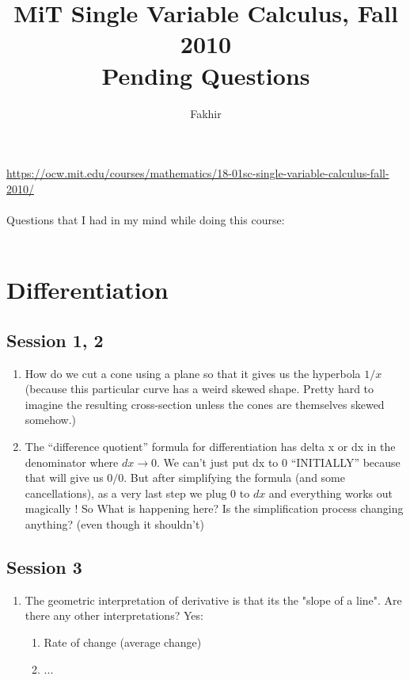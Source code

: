 \documentclass[]{article}
\title{MiT Single Variable Calculus, Fall 2010 \\ Pending Questions}
\author{Fakhir}
\begin{document}
\maketitle

\url{https://ocw.mit.edu/courses/mathematics/18-01sc-single-variable-calculus-fall-2010/}\\~\\

Questions that I had in my mind while doing this course: \\~\\

\section{Differentiation}
\subsection{Session 1, 2}
\begin{enumerate}
	\item How do we cut a cone using a plane so that it gives us the hyperbola $1/x$ (because this particular curve has a weird skewed shape. Pretty hard to imagine the resulting cross-section unless the cones are themselves skewed somehow.)
	
	\item The ``difference quotient'' formula for differentiation has delta x or dx in the denominator where $dx \rightarrow 0$. We can't just put dx to 0 ``INITIALLY'' because that will give us $0/0$. But after simplifying the formula (and some cancellations), as a very last step we plug 0 to $dx$ and everything works out magically ! So What is happening here? Is the simplification process changing anything? (even though it shouldn't)
\end{enumerate}

\subsection{Session 3}

\begin{enumerate}
	\item The geometric interpretation of derivative is that its the "slope of a line". Are there any other interpretations? 
	Yes:
	\begin{enumerate}
		\item Rate of change (average change)
		\item ...
	\end{enumerate}

	
\end{enumerate}
\end{document}
